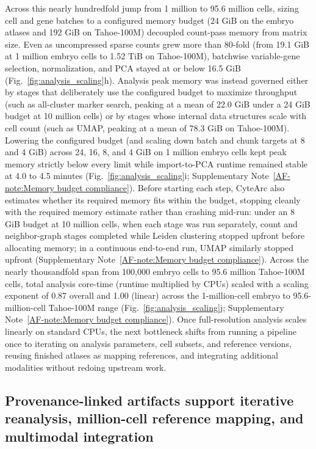 \documentclass[11pt]{article}
\newcommand{\sref}[1]{\ref*{AF-#1}}
\begin{document}
Across this nearly hundredfold jump from 1 million to 95.6 million cells, sizing cell and gene batches to a configured memory budget (24 GiB on the embryo atlases and 192 GiB on Tahoe-100M) decoupled count-pass memory from matrix size. Even as uncompressed sparse counts grew more than 80-fold (from 19.1 GiB at 1 million embryo cells to 1.52 TiB on Tahoe-100M), batchwise variable-gene selection, normalization, and PCA stayed at or below 16.5 GiB (Fig.~\ref{fig:analysis_scaling}h). Analysis peak memory was instead governed either by stages that deliberately use the configured budget to maximize throughput (such as all-cluster marker search, peaking at a mean of 22.0 GiB under a 24 GiB budget at 10 million cells) or by stages whose internal data structures scale with cell count (such as UMAP, peaking at a mean of 78.3 GiB on Tahoe-100M). Lowering the configured budget (and scaling down batch and chunk targets at 8 and 4 GiB) across 24, 16, 8, and 4 GiB on 1 million embryo cells kept peak memory strictly below every limit while import-to-PCA runtime remained stable at 4.0 to 4.5 minutes (Fig.~\ref{fig:analysis_scaling}i; Supplementary Note~\sref{note:Memory budget compliance}). Before starting each step, CyteArc also estimates whether its required memory fits within the budget, stopping cleanly with the required memory estimate rather than crashing mid-run: under an 8 GiB budget at 10 million cells, when each stage was run separately, count and neighbor-graph stages completed while Leiden clustering stopped upfront before allocating memory; in a continuous end-to-end run, UMAP similarly stopped upfront (Supplementary Note~\sref{note:Memory budget compliance}). Across the nearly thousandfold span from 100,000 embryo cells to 95.6 million Tahoe-100M cells, total analysis core-time (runtime multiplied by CPUs) scaled with a scaling exponent of 0.87 overall and 1.00 (linear) across the 1-million-cell embryo to 95.6-million-cell Tahoe-100M range (Fig.~\ref{fig:analysis_scaling}j; Supplementary Note~\sref{note:Memory budget compliance}). Once full-resolution analysis scales linearly on standard CPUs, the next bottleneck shifts from running a pipeline once to iterating on analysis parameters, cell subsets, and reference versions, reusing finished atlases as mapping references, and integrating additional modalities without redoing upstream work.

\subsection*{Provenance-linked artifacts support iterative reanalysis, million-cell reference mapping, and multimodal integration}\label{sec:Artifacts, Map & WNN}
\end{document}
